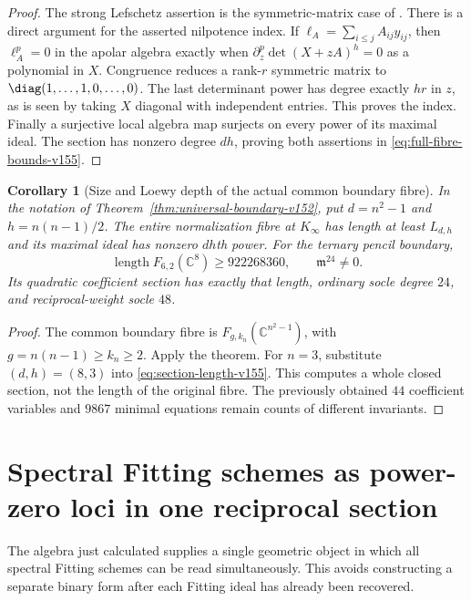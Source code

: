 \documentclass[11pt,reqno]{amsart}
\numberwithin{equation}{section}
\newtheorem{corollary}[theorem]{Corollary}
\theoremstyle{definition}\newtheorem{definition}[theorem]{Definition}
\theoremstyle{remark}\newtheorem{remark}[theorem]{Remark}
\newcommand{\C}{\mathbb C}\newcommand{\Q}{\mathbb Q}
\DeclareMathOperator{\length}{length}
\begin{document}
\begin{proof}
The strong Lefschetz assertion is the symmetric-matrix case of
\cite[Theorem~4 and Example~5]{NagaokaWachi2024}.
There is a direct argument for the asserted nilpotence index.
If $\ell_A=\sum_{i\leq j}A_{ij}y_{ij}$, then
$\ell_A^p=0$ in the apolar algebra exactly when
$\partial_z^p\det(X+zA)^h=0$ as a polynomial in $X$.
Congruence reduces a rank-$r$ symmetric matrix to
$\diag(1,\ldots,1,0,\ldots,0)$.
The last determinant power has degree exactly $hr$ in $z$, as
is seen by taking $X$ diagonal with independent entries.
This proves the index.  Finally a surjective local algebra map
surjects on every power of its maximal ideal.  The section has
nonzero degree $dh$, proving both assertions in
\eqref{eq:full-fibre-bounds-v155}.
\end{proof}

\begin{corollary}[Size and Loewy depth of the actual common boundary fibre]
\label{cor:boundary-size-v155}
In the notation of Theorem~\ref{thm:universal-boundary-v152}, put
$d=n^2-1$ and $h=n(n-1)/2$.  The entire normalization fibre at
$K_\infty$ has length at least $L_{d,h}$ and its maximal ideal has
nonzero $dh$th power.  For the ternary pencil boundary,
\begin{equation}\label{eq:ternary-large-section-v155}
 \length F_{6,2}(\C^8)\geq922268360,
       \qquad\mathfrak m^{24}\ne0.
\end{equation}
Its quadratic coefficient section has exactly that length, ordinary
socle degree $24$, and reciprocal-weight socle $48$.
\end{corollary}
\begin{proof}
The common boundary fibre is $F_{g,k_n}(\C^{n^2-1})$, with
$g=n(n-1)\geq k_n\geq2$.  Apply the theorem.
For $n=3$, substitute $(d,h)=(8,3)$ into
\eqref{eq:section-length-v155}.
This computes a whole closed section, not the length of the original
fibre.  The previously obtained $44$ coefficient variables and
$9867$ minimal equations remain counts of different invariants.
\end{proof}

\section{Spectral Fitting schemes as power-zero loci in one reciprocal section}
\label{sec:power-spectral-v155}
The algebra just calculated supplies a single geometric object in
which all spectral Fitting schemes can be read simultaneously.
This avoids constructing a separate binary form after each Fitting
ideal has already been recovered.
\end{document}
